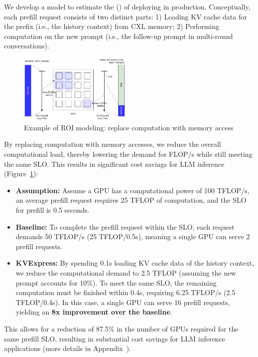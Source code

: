 We develop a model to estimate the \roifull (\roi) of deploying \tool in production.
Conceptually, each prefill request consists of two distinct parts: 1) Loading KV cache data for the prefix (i.e., the history context) from CXL memory; 2) Performing computation on the new prompt (i.e., the follow-up prompt in multi-round conversations).

\begin{figure}
    \includegraphics[width=0.48\textwidth]{fig/future/roi_explanation.pdf}
 \caption[Example of ROI modeling]{Example of ROI modeling: replace computation with memory access}
    \label{fig:roi-modeling}
\end{figure}

By replacing computation with memory accesses, we reduce the overall computational load, thereby lowering the demand for FLOP/s while still meeting the same SLO. This results in significant cost savings for LLM inference (Figure~\ref{fig:roi-modeling}):

\begin{itemize}
\item \textbf{Assumption:} Assume a GPU has a computational power of 100 TFLOP/s, an average prefill request requires 25 TFLOP of computation, and the SLO for prefill is 0.5 seconds.
\item \textbf{Baseline:} To complete the prefill request within the SLO, each request demands 50 TFLOP/s (25 TFLOP/0.5s), meaning a single GPU can serve 2 prefill requests. 
\item \textbf{KVExpress:} By spending 0.1s loading KV cache data of the history context, we reduce the computational demand to 2.5 TFLOP (assuming the new prompt accounts for 10\%). To meet the same SLO, the remaining computation must be finished within 0.4s, requiring 6.25 TFLOP/s (2.5 TFLOP/0.4s). In this case, a single GPU can serve 16 prefill requests, yielding an \textbf{8x improvement over the baseline}.
\end{itemize}





This allows for a reduction of 87.5\% in the number of GPUs required for the same prefill SLO, resulting in substantial cost savings for LLM inference applications (more details in Appendix~\cite{roi_model}).


